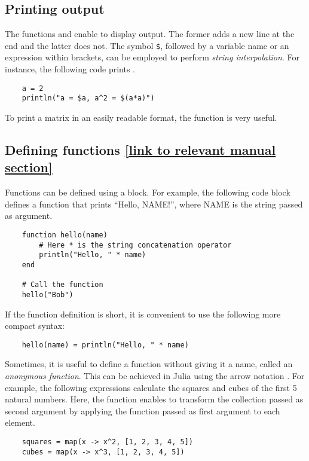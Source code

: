\subsection*{Printing output}%
The functions  and  enable to display output.
The former adds a new line at the end and the latter does not.
The symbol \texttt{\$}, followed by a variable name or an expression within brackets,
can be employed to perform \emph{string interpolation}.
For instance, the following code prints .
\begin{verbatim}
    a = 2
    println("a = $a, a^2 = $(a*a)")
\end{verbatim}
To print a matrix in an easily readable format,
the  function is very useful.

\subsection*{Defining functions {\footnotesize \href{https://docs.julialang.org/en/v1/manual/functions/} {[link to relevant manual section]}}}%
\label{sub:defining_functions}
Functions can be defined using a  block.
For example, the following code block defines a function that prints ``Hello, NAME!'',
where NAME is the string passed as argument.

\begin{verbatim}
    function hello(name)
        # Here * is the string concatenation operator
        println("Hello, " * name)
    end

    # Call the function
    hello("Bob")
\end{verbatim}

If the function definition is short,
it is convenient to use the following more compact syntax:
\begin{verbatim}
    hello(name) = println("Hello, " * name)
\end{verbatim}

Sometimes, it is useful to define a function without giving it a name, called an \emph{anonymous function}.
This can be achieved in Julia using the arrow notation \julia{->}.
For example, the following expressions calculate the squares and cubes of the first 5 natural numbers.
Here, the function  enables to transform the collection passed as second argument by applying the function passed as first argument to each element.
\begin{verbatim}
    squares = map(x -> x^2, [1, 2, 3, 4, 5])
    cubes = map(x -> x^3, [1, 2, 3, 4, 5])
\end{verbatim}

